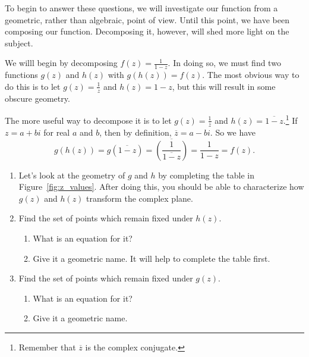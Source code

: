 \documentclass[../gatm.tex]{subfiles}
\begin{document}
To begin to answer these questions, we will investigate our function from a geometric, rather than algebraic, point of view. Until this point, we have been composing our function. Decomposing it, however, will shed more light on the subject.

We willl begin by decomposing $f(z)=\frac{1}{1-z}$. In doing so, we must find two functions $g(z)$ and $h(z)$ with $g(h(z))=f(z)$. The most obvious way to do this is to let $g(z)=\frac{1}{z}$ and $h(z)=1-z$, but this will result in some obscure geometry.

The more useful way to decompose it is to let $g(z)=\frac{1}{\overline{z}}$ and $h(z)=\overline{1-z}$.\footnote{Remember that $\overline{z}$ is the complex conjugate.} If $z=a+bi$ for real $a$ and $b$, then by definition, $\overline{z}=a-bi$. So we have
$$g(h(z))=g(\overline{1-z})=\overline{\left(\frac{1}{\overline{1-z}}\right)}=\frac{1}{1-z}=f(z).$$

\begin{enumerate}
\setcounter{enumi}{\value{problem_i}}
\item Let's look at the geometry of $g$ and $h$ by completing the table in Figure~\ref{fig:z_values}. After doing this, you should be able to characterize how $g(z)$ and $h(z)$ transform the complex plane.
\item Find the set of points which remain fixed under $h(z)$.
\begin{enumerate}
\item What is an equation for it?
\item Give it a geometric name. It will help to complete the table first.
\end{enumerate}
\item Find the set of points which remain fixed under $g(z)$.
\begin{enumerate}
\item What is an equation for it?
\item Give it a geometric name.
\end{enumerate}
\setcounter{problem_i}{\value{enumi}}
\end{enumerate}
\end{document}
